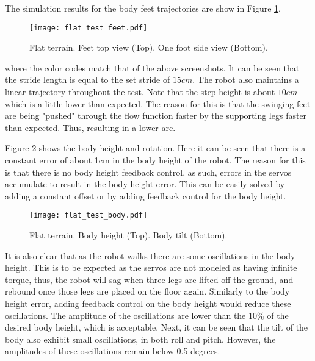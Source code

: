     \noindent
    The simulation results for the body feet trajectories are show in Figure \ref{fig:flat_feet},
    \begin{figure}[h]
        \centering
        \texttt{[image: flat\_test\_feet.pdf]}
        \caption{Flat terrain. Feet top view (Top). One foot side view (Bottom).}
        \label{fig:flat_feet}
    \end{figure}

    \noindent
    where the color codes match that of the above screenshots. It can be seen that the stride length is equal to the set stride of \(15cm\). The robot also maintains a linear trajectory throughout the test. Note that the step height is about \(10cm\) which is a little lower than expected. The reason for this is that the swinging feet are being "pushed" through the flow function faster by the supporting legs faster than expected. Thus, resulting in a lower arc.

    Figure \ref{fig:flat_body} shows the body height and rotation. Here it can be seen that there is a constant error of about 1cm in the body height of the robot. The reason for this is that there is no body height feedback control, as such, errors in the servos accumulate to result in the body height error. This can be easily solved by adding a constant offset or by adding feedback control for the body height.
    \begin{figure}[h]
        \centering
        \texttt{[image: flat\_test\_body.pdf]}
        \caption{Flat terrain. Body height (Top). Body tilt (Bottom).}
        \label{fig:flat_body}
    \end{figure}
    It is also clear that as the robot walks there are some oscillations in the body height. This is to be expected as the servos are not modeled as having infinite torque, thus, the robot will sag when three legs are lifted off the ground, and rebound once those legs are placed on the floor again. Similarly to the body height error, adding feedback control on the body height would reduce these oscillations. The amplitude of the oscillations are lower than the \(10\%\) of the desired body height, which is acceptable. Next, it can be seen that the tilt of the body also exhibit small oscillations, in both roll and pitch. However, the amplitudes of these oscillations remain below 0.5 degrees.

    
